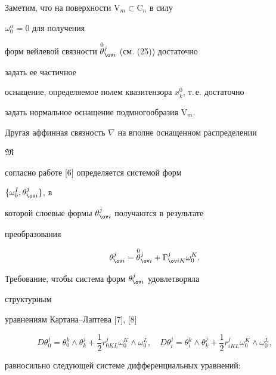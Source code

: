  


Заметим, что на поверхности $\mathrm V_m\subset\mathrm C_n$ в силу 


$\omega^\alpha_0=0$ для получения 


форм вейлевой связности $\up{0}{\theta}^j_{\ov i}$ (см. (25)) достаточно 


задать ее частичное 


оснащение, определяемое полем квазитензора $x^0_k$, т.\,е. достаточно 


задать нормальное оснащение подмногообразия $\mathrm V_m$. 


 


Другая аффинная связность $\nabla$ на вполне оснащенном распределении 


$\frak M$ 


согласно работе [6] определяется системой форм 


$\{\omega^I_0,\theta^j_{\ov i}\}$, в 


которой слоевые формы $\theta^j_{\ov i}$ получаются в результате 


преобразования 


$$ 


\theta^j_{\ov i}=\up{0}{\theta}^j_{\ov i}+ 


\Gamma^j_{\ov i K}\omega^K_0. 


$$ 


Требование, чтобы система форм $\theta^j_{\ov i}$ удовлетворяла 


структурным 


уравнениям Картана--Лаптева [7], [8] 


$$ 


D\theta^j_0=\theta^k_0\wedge\theta^j_k+\frac{1}{2} 


r^j_{0K L}\omega^K_0\wedge\omega^L_0,\quad 


D\theta^j_i=\theta^k_i\wedge \theta^j_k+\frac{1}{2} 


r^j_{i K L}\omega^K_0\wedge\omega^L_0, 


$$ 


равносильно следующей системе дифференциальных уравнений: 


